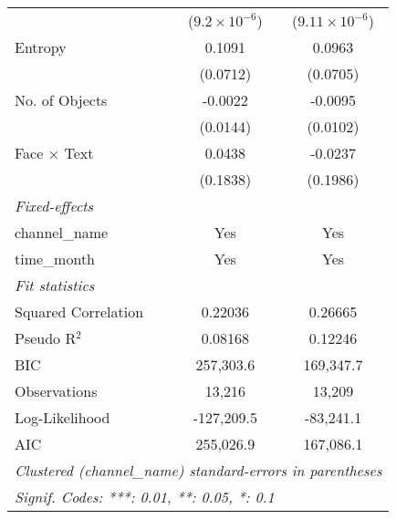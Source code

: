 \begin{table}[htbp]
\begin{tabular}{lcc}
                           & ($9.2\times 10^{-6}$)   & ($9.11\times 10^{-6}$)\\    
      Entropy              & 0.1091                  & 0.0963\\   
                           & (0.0712)                & (0.0705)\\   
      No. of Objects       & -0.0022                 & -0.0095\\   
                           & (0.0144)                & (0.0102)\\   
      Face × Text          & 0.0438                  & -0.0237\\   
                           & (0.1838)                & (0.1986)\\   
      \midrule
      \emph{Fixed-effects}\\
      channel\_name        & Yes                     & Yes\\  
      time\_month          & Yes                     & Yes\\  
      \midrule
      \emph{Fit statistics}\\
      Squared Correlation  & 0.22036                 & 0.26665\\  
      Pseudo R$^2$         & 0.08168                 & 0.12246\\  
      BIC                  & 257,303.6               & 169,347.7\\  
      Observations         & 13,216                  & 13,209\\  
      Log-Likelihood       & -127,209.5              & -83,241.1\\  
      AIC                  & 255,026.9               & 167,086.1\\  
      \midrule \midrule
      \multicolumn{3}{l}{\emph{Clustered (channel\_name) standard-errors in parentheses}}\\
      \multicolumn{3}{l}{\emph{Signif. Codes: ***: 0.01, **: 0.05, *: 0.1}}\\
   \end{tabular}
\end{table}


